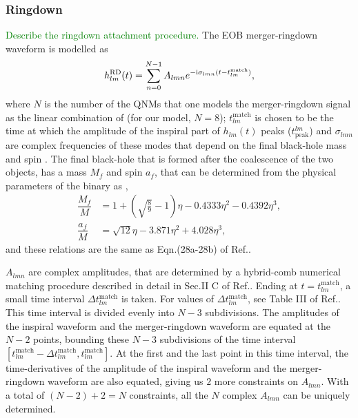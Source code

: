 \documentclass[aps,
prd,
amsmath,
amssymb,
twocolumn,
floatfix,
groupedaddress]{revtex4-1}
\newcommand{\Sum}{\displaystyle\sum\limits}
\newcommand{\ii}{{\rm i}}
\newcommand{\peak}{\mathrm{peak}}
\newcommand{\RD}{\mathrm{RD}}
\def\l({\left(}
\def\r){\right)}
\begin{document}
\subsubsection{Ringdown}\label{sec:level3:RD}
\textcolor{green}{Describe the ringdown attachment procedure.}
The EOB merger-ringdown waveform is modelled as \citep{EOBNRdevel01,EOBNRdevel02,EOBNRdevel04,EOBNRdevel04}
\begin{equation}
h_{lm}^{\RD}(t) = \Sum^{N-1}_{n=0}A_{lmn}e^{-\ii\sigma_{lmn}(t-t_{lm}^{\mathrm{match}})},
\end{equation}
where $N$ is the number of the QNMs that one models the merger-ringdown signal as the linear combination of (for our model, $N=8$); $t_{lm}^{\mathrm{match}}$ is chosen to be the time at which the amplitude of the inspiral part of $h_{lm}(t)$ peaks ($t^{lm}_{\peak}$)\citep{EOBNRdevel01,BuonannoEOBv2Main} and $\sigma_{lmn}$ are complex frequencies of these modes that depend on the final black-hole mass and spin \citep{BHRDQNMs}. The final black-hole that is formed after the coalescence of the two objects, has a mass $M_f$ and spin $a_f$, that can be determined from the physical parameters of the binary as \citep{BuonannoEOBv2Main},
\begin{subequations}
\begin{align}
\dfrac{M_f}{M} &= 1 + \l(\sqrt{\frac{8}{9}}-1\r)\eta - 0.4333\eta^2 - 0.4392\eta^3,\\
\dfrac{a_f}{M} &= \sqrt{12}\eta - 3.871\eta^2 + 4.028\eta^3,
\end{align}
\end{subequations}
and these relations are the same as Eqn.(28a-28b) of Ref.\citep{BuonannoEOBv2Main}.

$A_{lmn}$ are complex amplitudes, that are determined by a hybrid-comb numerical matching procedure described in detail in Sec.II C of Ref.\citep{BuonannoEOBv2Main}. Ending at $t=t_{lm}^{\mathrm{match}}$, a small time interval $\Delta t^{\mathrm{match}}_{lm}$ is taken. For values of $\Delta t^{\mathrm{match}}_{lm}$, see Table III of Ref.\citep{BuonannoEOBv2Main}. This time interval is divided evenly into $N-3$ subdivisions. The amplitudes of the inspiral waveform and the merger-ringdown waveform are equated at the $N-2$ points, bounding these $N-3$ subdivisions of the time interval $\left[t_{lm}^{\mathrm{match}}-\Delta t^{\mathrm{match}}_{lm},t_{lm}^{\mathrm{match}}\right]$. At the first and the last point in this time interval, the time-derivatives of the amplitude of the inspiral waveform and the merger-ringdown waveform are also equated, giving us $2$ more constraints on $A_{lmn}$. With a total of $(N-2)+2=N$ constraints, all the $N$ complex $A_{lmn}$ can be uniquely determined.
\end{document}
